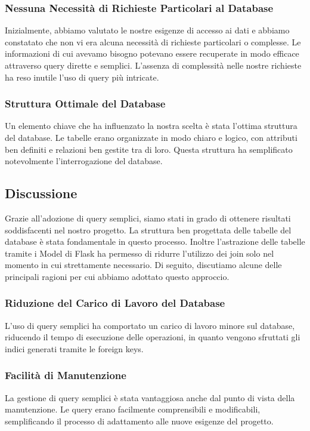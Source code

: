 \documentclass{article}
\begin{document}
\subsubsection{Nessuna Necessità di Richieste Particolari al Database}
Inizialmente, abbiamo valutato le nostre esigenze di accesso ai dati e abbiamo constatato che non vi era alcuna necessità di richieste particolari o complesse. Le informazioni di cui avevamo bisogno potevano essere recuperate in modo efficace attraverso query dirette e semplici. L'assenza di complessità nelle nostre richieste ha reso inutile l'uso di query più intricate.
\subsubsection{Struttura Ottimale del Database}
Un elemento chiave che ha influenzato la nostra scelta è stata l'ottima struttura del database. Le tabelle erano organizzate in modo chiaro e logico, con attributi ben definiti e relazioni ben gestite tra di loro. Questa struttura ha semplificato notevolmente l'interrogazione del database.


\subsection{Discussione}
Grazie all'adozione di query semplici, siamo stati in grado di ottenere risultati soddisfacenti nel nostro progetto. La struttura ben progettata delle tabelle del database è stata fondamentale in questo processo. 
Inoltre l'astrazione delle tabelle tramite i Model di Flask ha permesso di ridurre l'utilizzo dei join solo nel momento in cui strettamente necessario.
Di seguito, discutiamo alcune delle principali ragioni per cui abbiamo adottato questo approccio.
\subsubsection{Riduzione del Carico di Lavoro del Database}
L'uso di query semplici ha comportato un carico di lavoro minore sul database, riducendo il tempo di esecuzione delle operazioni, in quanto vengono sfruttati gli indici generati tramite le foreign keys.
\subsubsection{Facilità di Manutenzione}
La gestione di query semplici è stata vantaggiosa anche dal punto di vista della manutenzione. Le query erano facilmente comprensibili e modificabili, semplificando il processo di adattamento alle nuove esigenze del progetto.
\end{document}
